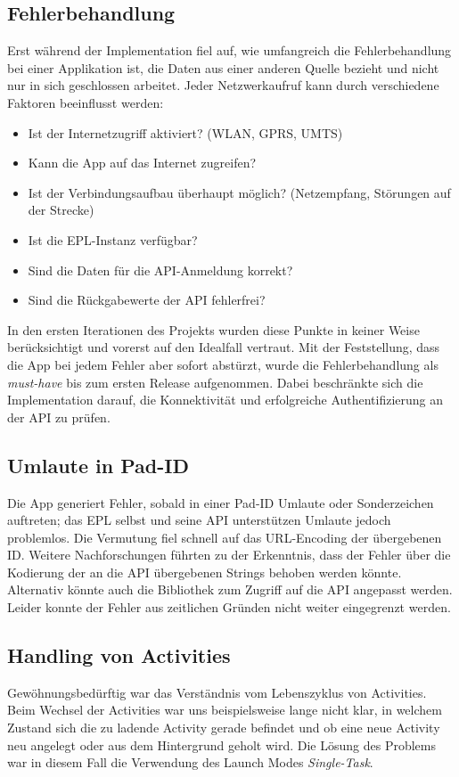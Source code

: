 \newpage
\subsection{Fehlerbehandlung}
Erst während der Implementation fiel auf, wie umfangreich die Fehlerbehandlung bei einer Applikation ist, die Daten aus einer anderen Quelle bezieht und nicht nur in sich geschlossen arbeitet.
Jeder Netzwerkaufruf kann durch verschiedene Faktoren beeinflusst werden:
\begin{itemize}
	\item Ist der Internetzugriff aktiviert? (WLAN, GPRS, UMTS)
	\item Kann die App auf das Internet zugreifen?
	\item Ist der Verbindungsaufbau überhaupt möglich? (Netzempfang, Störungen auf der Strecke)
	\item Ist die EPL-Instanz verfügbar?
	\item Sind die Daten für die API-Anmeldung korrekt?
	\item Sind die Rückgabewerte der API fehlerfrei?
\end{itemize}

In den ersten Iterationen des Projekts wurden diese Punkte in keiner Weise berücksichtigt und vorerst auf den Idealfall vertraut.
Mit der Feststellung, dass die App bei jedem Fehler aber sofort abstürzt, wurde die Fehlerbehandlung als \textit{must-have} bis zum ersten Release aufgenommen.
Dabei beschränkte sich die Implementation darauf, die Konnektivität und erfolgreiche Authentifizierung an der API zu prüfen.

\subsection{Umlaute in Pad-ID}
Die App generiert Fehler, sobald in einer Pad-ID Umlaute oder Sonderzeichen auftreten; das EPL selbst und seine API unterstützen Umlaute jedoch problemlos.
Die Vermutung fiel schnell auf das URL-Encoding der übergebenen ID.
Weitere Nachforschungen führten zu der Erkenntnis, dass der Fehler über die Kodierung der an die API übergebenen Strings behoben werden könnte.
Alternativ könnte auch die Bibliothek zum Zugriff auf die API angepasst werden.
Leider konnte der Fehler aus zeitlichen Gründen nicht weiter eingegrenzt werden.

\subsection{Handling von Activities}
\label{sub:prob:activities}
Gewöhnungsbedürftig war das Verständnis vom Lebenszyklus von Activities.
Beim Wechsel der Activities war uns beispielsweise lange nicht klar, in welchem Zustand sich die zu ladende Activity gerade befindet und ob eine neue Activity neu angelegt oder aus dem Hintergrund geholt wird.
Die Lösung des Problems war in diesem Fall die Verwendung des Launch Modes \textit{Single-Task}.

